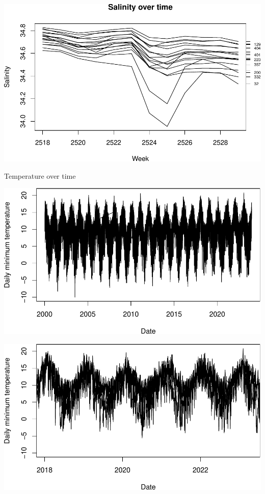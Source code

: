 \documentclass[
]{article}
\begin{document}
\includegraphics{habmodel_files/figure-latex/unnamed-chunk-6-4.pdf}

Temperature over time

\includegraphics{habmodel_files/figure-latex/unnamed-chunk-7-1.pdf}

\includegraphics{habmodel_files/figure-latex/unnamed-chunk-8-1.pdf}
\end{document}
